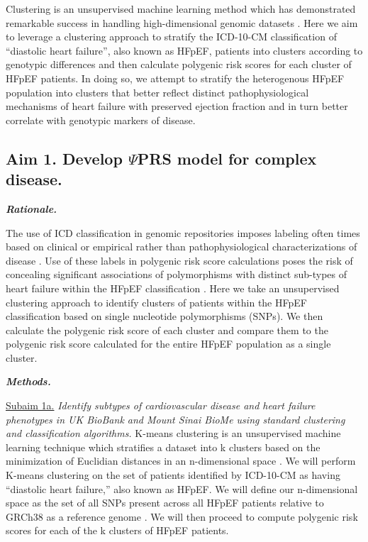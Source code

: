 \documentclass[11pt]{article}  %
\newlength\tindent
\renewcommand{\indent}{\hspace*{\tindent}}
\begin{document}
\hspace{10mm}Clustering is an unsupervised machine learning method which has demonstrated remarkable success in handling high-dimensional genomic datasets \cite{hibar_genetic_2013,xu_model-based_2019, narita_clustering_2020}. Here we aim to leverage a clustering approach to stratify the ICD-10-CM classification of “diastolic heart failure”, also known as HFpEF, patients into clusters according to genotypic differences and then calculate polygenic risk scores for each cluster of HFpEF patients. In doing so, we attempt to stratify the heterogenous HFpEF population into clusters that better reflect distinct pathophysiological mechanisms of heart failure with preserved ejection fraction and in turn better correlate with genotypic markers of disease.




\subsection*{Aim 1. Develop $\Psi$PRS model for complex disease.}

\indent \textbf{\textit{Rationale.}}

The use of ICD classification in genomic repositories imposes labeling often times based on clinical or empirical rather than pathophysiological characterizations of disease \cite{weiner_point_2018, cox_good_2009}. Use of these labels in polygenic risk score calculations poses the risk of concealing significant associations of polymorphisms with distinct sub-types of heart failure within the HFpEF classification \cite{severino_structural_2020}. Here we take an unsupervised clustering approach to identify clusters of patients within the HFpEF classification based on single nucleotide polymorphisms (SNPs). We then calculate the polygenic risk score of each cluster and compare them to the polygenic risk score calculated for the entire HFpEF population as a single cluster.


\indent \textbf{\textit{Methods.}}

\indent \underline{Subaim 1a.} \textit{Identify subtypes of cardiovascular disease and heart failure phenotypes in UK BioBank and Mount Sinai BioMe using standard clustering and classification algorithms.} K-means clustering is an unsupervised machine learning technique which stratifies a dataset into k clusters based on the minimization of Euclidian distances in an n-dimensional space \cite{oyelade_clustering_2016}. We will perform K-means clustering on the set of patients identified by ICD-10-CM as having “diastolic heart failure,” also known as HFpEF. We will define our n-dimensional space as the set of all SNPs present across all HFpEF patients relative to GRCh38 as a reference genome \cite{ballouz_is_2019}. We will then proceed to compute polygenic risk scores for each of the k clusters of HFpEF patients.
\end{document}

